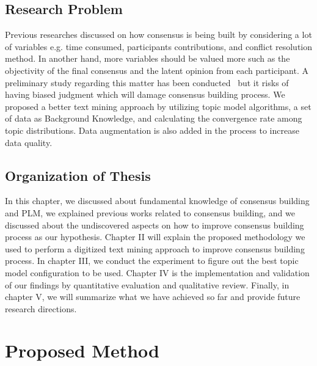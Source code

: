 \documentclass[senior]{IPSstyle}
\begin{document}
\section{Research Problem}

Previous researches discussed on how consensus is being built by considering a lot of variables e.g. time consumed, participants contributions, and conflict resolution method. In another hand, more variables should be valued more such as the objectivity of the final consensus and the latent opinion from each participant. A preliminary study regarding this matter has been conducted~\cite{goto2} but it risks of having biased judgment which will damage consensus building process. We proposed a better text mining approach by utilizing topic model algorithms, a set of data as Background Knowledge, and calculating the convergence rate among topic distributions. Data augmentation is also added in the process to increase data quality.

\section{Organization of Thesis}

In this chapter, we discussed about fundamental knowledge of consensus building and PLM, we explained previous works related to consensus building, and we discussed about the undiscovered aspects on how to improve consensus building process as our hypothesis. Chapter II will explain the proposed methodology we used to perform a digitized text mining approach to improve consensus building process. In chapter III, we conduct the experiment to figure out the best topic model configuration to be used. Chapter IV is the implementation and validation of our findings by quantitative evaluation and qualitative review. Finally, in chapter V, we will summarize what we have achieved so far and provide future research directions.

\chapter{Proposed Method} 
\end{document}
